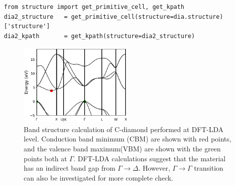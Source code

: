 \begin{lstlisting}[style=Python]
from structure import get_primitive_cell, get_kpath
dia2_structure   = get_primitive_cell(structure=dia.structure)['structure']
dia2_kpath       = get_kpath(structure=dia2_structure)
\end{lstlisting}

\begin{figure}
	\centering
	\includegraphics[width=0.5\textwidth]{figures/lab_excited_band_si}
	\caption{Band structure calculation of C-diamond performed at DFT-LDA level. Conduction band minimum (CBM) are shown with red points, and the valence band maximum(VBM)  are shown with the green points both at $\Gamma$.  DFT-LDA calculations suggest that the material has an indirect band gap from $\Gamma\rightarrow{\Delta}$. However, $\Gamma\rightarrow{\Gamma}$ transition can also be investigated for more complete check. }
	\label{fig:lab_ex_bands}
\end{figure}

